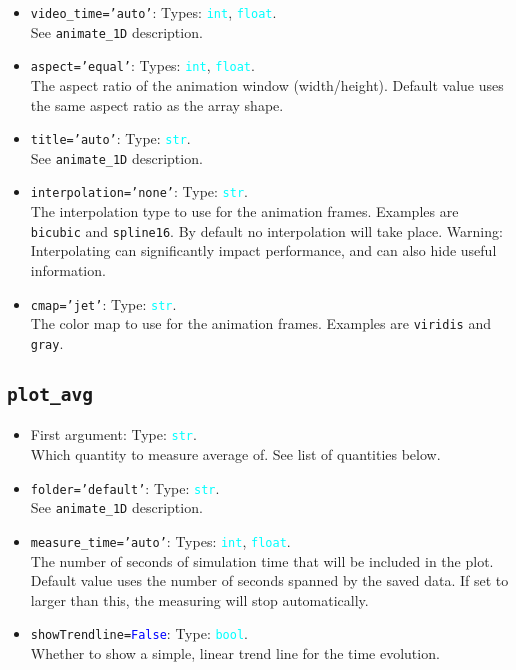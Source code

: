 \documentclass{article}
\newcommand{\ttt}[1]{\texttt{#1}}
\newcommand{\ptype}[1]{\texttt{\textcolor{cyan}{#1}}}
\newcommand{\cbl}[1]{\textcolor{blue}{#1}}
\newcommand{\cro}[1]{\textcolor{RedOrange}{#1}}
\newcommand{\cyo}[1]{\textcolor{YellowOrange}{#1}}
\begin{document}
\begin{itemize}
	\item \ttt{\cro{video\_time}=\cyo{'auto'}}: Types: \ptype{int}, \ptype{float}.\\See \ttt{animate\_1D} description.
	\item \ttt{\cro{aspect}=\cyo{'equal'}}: Types: \ptype{int}, \ptype{float}.\\The aspect ratio of the animation window (width/height). Default value uses the same aspect ratio as the array shape.
	\item \ttt{\cro{title}=\cyo{'auto'}}: Type: \ptype{str}.\\See \ttt{animate\_1D} description.
	\item \ttt{\cro{interpolation}=\cyo{'none'}}: Type: \ptype{str}.\\The interpolation type to use for the animation frames. Examples are \ttt{bicubic} and \ttt{spline16}. By default no interpolation will take place. Warning: Interpolating can significantly impact performance, and can also hide useful information.
	\item \ttt{\cro{cmap}=\cyo{'jet'}}: Type: \ptype{str}.\\The color map to use for the animation frames. Examples are \ttt{viridis} and \ttt{gray}.
\end{itemize}

\subsection{\ttt{plot\_avg}}
\label{sec:pa}
\begin{itemize}
	\item First argument: Type: \ptype{str}.\\Which quantity to measure average of. See list of quantities below.
	\item \ttt{\cro{folder}=\cyo{'default'}}: Type: \ptype{str}.\\See \ttt{animate\_1D} description.
	\item \ttt{\cro{measure\_time}=\cyo{'auto'}}: Types: \ptype{int}, \ptype{float}.\\The number of seconds of simulation time that will be included in the plot. Default value uses the number of seconds spanned by the saved data. If set to larger than this, the measuring will stop automatically.
	\item \ttt{\cro{showTrendline}=\cbl{False}}: Type: \ptype{bool}.\\Whether to show a simple, linear trend line for the time evolution.
\end{itemize}
\end{document}
